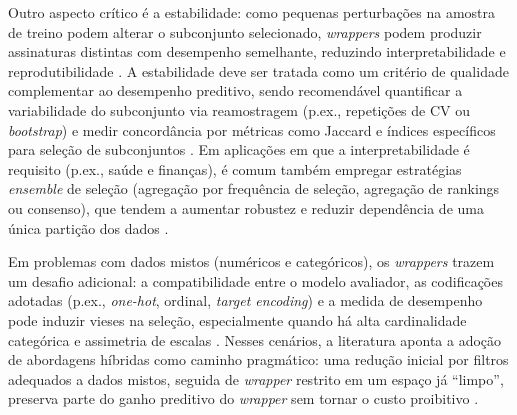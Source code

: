 Outro aspecto crítico é a estabilidade: como pequenas perturbações na amostra de treino podem alterar o subconjunto selecionado, \textit{wrappers} podem produzir assinaturas distintas com desempenho semelhante, reduzindo interpretabilidade e reprodutibilidade \cite{KHAIRE20221060,somol2010evaluating}. A estabilidade deve ser tratada como um critério de qualidade complementar ao desempenho preditivo, sendo recomendável quantificar a variabilidade do subconjunto via reamostragem (p.ex., repetições de CV ou \textit{bootstrap}) e medir concordância por métricas como Jaccard e índices específicos para seleção de subconjuntos \cite{KHAIRE20221060,somol2010evaluating,BARBIERI2024123667}. Em aplicações em que a interpretabilidade é requisito (p.ex., saúde e finanças), é comum também empregar estratégias \textit{ensemble} de seleção (agregação por frequência de seleção, agregação de rankings ou consenso), que tendem a aumentar robustez e reduzir dependência de uma única partição dos dados \cite{KHAIRE20221060,Theng2024,BARBIERI2024123667}.

Em problemas com dados mistos (numéricos e categóricos), os \textit{wrappers} trazem um desafio adicional: a compatibilidade entre o modelo avaliador, as codificações adotadas (p.ex., \textit{one-hot}, ordinal, \textit{target encoding}) e a medida de desempenho pode induzir vieses na seleção, especialmente quando há alta cardinalidade categórica e assimetria de escalas \cite{SolorioFernandez2022,EBRAHIMIWARKIANI2025129372}. Nesses cenários, a literatura aponta a adoção de abordagens híbridas como caminho pragmático: uma redução inicial por filtros adequados a dados mistos, seguida de \textit{wrapper} restrito em um espaço já “limpo”, preserva parte do ganho preditivo do \textit{wrapper} sem tornar o custo proibitivo \cite{SolorioFernandez2022,EBRAHIMIWARKIANI2025129372,Theng2024}.

